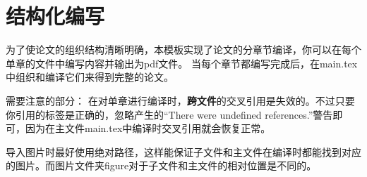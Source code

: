 \documentclass[../../main.tex]{subfiles}
\begin{document}
\section{结构化编写}

为了使论文的组织结构清晰明确，本模板实现了论文的分章节编译，你可以在每个单章的文件中编写内容并输出为pdf文件。
当每个章节都编写完成后，在main.tex中组织和编译它们来得到完整的论文。




需要注意的部分：
在对单章进行编译时，\textbf{跨文件}的交叉引用是失效的。不过只要你引用的标签是正确的，忽略产生的“There were undefined references.”警告即可，因为在主文件main.tex中编译时交叉引用就会恢复正常。

导入图片时最好使用绝对路径，这样能保证子文件和主文件在编译时都能找到对应的图片。而图片文件夹figure对于子文件和主文件的相对位置是不同的。
\end{document}
